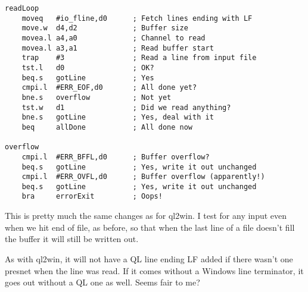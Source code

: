 \begin{lstlisting}[showstringspaces=false,tabsize=4]
readLoop
    moveq   #io_fline,d0      ; Fetch lines ending with LF
    move.w  d4,d2             ; Buffer size
    movea.l a4,a0             ; Channel to read
    movea.l a3,a1             ; Read buffer start
    trap    #3                ; Read a line from input file
    tst.l   d0                ; OK?
    beq.s   gotLine           ; Yes
    cmpi.l  #ERR_EOF,d0       ; All done yet?
    bne.s   overflow          ; Not yet
    tst.w   d1                ; Did we read anything?
    bne.s   gotLine           ; Yes, deal with it
    beq     allDone           ; All done now

overflow
    cmpi.l  #ERR_BFFL,d0      ; Buffer overflow?
    beq.s   gotLine           ; Yes, write it out unchanged
    cmpi.l  #ERR_OVFL,d0      ; Buffer overflow (apparently!)
    beq.s   gotLine           ; Yes, write it out unchanged   
    bra     errorExit         ; Oops!
\end{lstlisting}

This is pretty much the same changes as for ql2win. I test for any
input even when we hit end of file, as before, so that when the last
line of a file doesn't fill the buffer it will still be written out.

As with ql2win, it will not have a QL line ending LF added if there
wasn't one presnet when the line was read. If it comes without a Windows
line terminator, it goes out without a QL one as well. Seems fair
to me?
